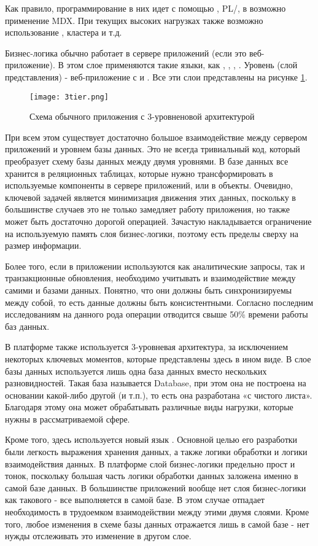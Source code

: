 Как правило, программирование в них идет с помощью \sql, PL/\sql, в \olap возможно применение MDX. При текущих высоких нагрузках также возможно использование \nosql, \hadoop кластера и т.д.

Бизнес-логика обычно работает в сервере приложений (если это веб-приложение). В этом слое применяются такие языки, как \java, \csharp, \python, \scala.
Уровень \ui (слой представления) - веб-приложение с \html и \js. Все эти слои представлены на рисунке \ref{fig:technology:logicblox:three_tier_architecture}.

\begin{figure}
	\centering
	\texttt{[image: 3tier.png]}
	\caption{Схема обычного приложения с 3-уровненовой архитектурой}
	\label{fig:technology:logicblox:three_tier_architecture}
\end{figure}

При всем этом существует достаточно большое взаимодействие между сервером приложений и уровнем базы данных. Это не всегда тривиальный код, который преобразует схему базы данных между двумя уровнями. В базе данных все хранится в реляционных таблицах, которые нужно трансформировать в используемые компоненты в сервере приложений, или в объекты. Очевидно, ключевой задачей является минимизация движения этих данных, поскольку в большинстве случаев это не только замедляет работу приложения, но также может быть достаточно дорогой операцией. Зачастую накладывается ограничение на используемую память слоя бизнес-логики, поэтому есть пределы сверху на размер информации.

Более того, если в приложении используются как аналитические запросы, так и транзакционные обновления, необходимо учитывать и взаимодействие между самими \olap и \oltp базами данных. Понятно, что они должны быть синхронизируемы между собой, то есть данные должны быть консистентными. Согласно последним исследованиям на данного рода операции отводится свыше 50\% времени работы баз данных.

В платформе \LB также используется 3-уровневая архитектура, за исключением некоторых ключевых моментов, которые представлены здесь в ином виде. В слое базы данных используется лишь одна база данных вместо нескольких разновидностей. Такая база называется \LB Database, при этом она не построена на основании какой-либо другой (\postgres и т.п.), то есть она разработана «с чистого листа». Благодаря этому она может обрабатывать различные виды нагрузки, которые нужны в рассматриваемой сфере.

Кроме того, здесь используется новый язык \logiql. Основной целью его разработки были легкость выражения хранения данных, а также логики обработки и логики взаимодействия данных. В платформе \LB слой бизнес-логики предельно прост и тонок, поскольку большая часть логики обработки данных заложена именно в самой базе данных. В большинстве приложений вообще нет слоя бизнес-логики как такового - все выполняется в самой базе. В этом случае отпадает необходимость в трудоемком взаимодействии между этими двумя слоями. Кроме того, любое изменения в схеме базы данных отражается лишь в самой базе - нет нужды отслеживать это изменение в другом слое.


